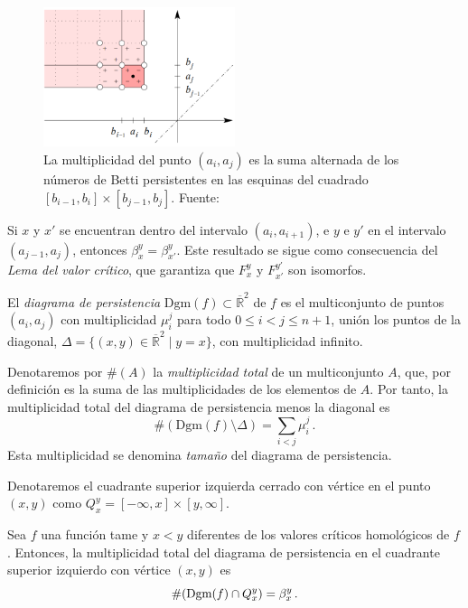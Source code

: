 \begin{figure}[!ht]
\centering
\includegraphics[width=0.5\textwidth]{include/figuras/multiplicidadEsquinas.png} 
\caption{La multiplicidad del punto $(a_i, a_j)$ es la suma alternada de los números de Betti persistentes en las esquinas del cuadrado $[b_{i-1}, b_i]\times[b_{j-1}, b_j]$. Fuente: \cite{Cohen-Steiner2007}}
\label{ref:multiplicidadDiagrama}
\end{figure}

\begin{remark}
Si $x$ y $x'$ se encuentran dentro del intervalo $(a_i, a_{i+1})$, e $y$ e $y'$ en el intervalo $(a_{j-1}, a_j)$, entonces $\beta_{x}^{y} = \beta_{x'}^{y}$. Este resultado se sigue como consecuencia del \emph{Lema del valor crítico}, que garantiza que $F_{x}^{y}$ y $F_{x'}^{y'}$ son isomorfos.
\end{remark}

\begin{definition}
El \emph{diagrama de persistencia} $\text{Dgm}(f) \subset \overline{\mathbb{R}}^2$ de $f$ es el multiconjunto de puntos $(a_i, a_j)$ con multiplicidad $\mu_{i}^{j}$ para todo $0 \leq i < j \leq n+1$, unión los puntos de la diagonal, $\Delta=\{(x, y) \in \overline{\mathbb{R}}^2 \mid y = x\}$, con multiplicidad infinito.
\end{definition}

Denotaremos por $\#(A)$ la \emph{multiplicidad total} de un multiconjunto $A$, que, por definición es la suma de las multiplicidades de los elementos de $A$. Por tanto, la multiplicidad total del diagrama de persistencia menos la diagonal es
\[
\#(\text{Dgm}(f) \setminus \Delta) = \sum_{i < j} \mu_{i}^{j}\,.
\]
Esta multiplicidad se denomina \emph{tamaño} del diagrama de persistencia.

Denotaremos el cuadrante superior izquierda cerrado con vértice en el punto $(x, y)$ como $Q_{x}^{y} = [-\infty, x] \times [y, \infty]$.

\begin{lemma}
Sea $f$ una función tame y $x < y$ diferentes de los valores críticos homológicos de $f$. Entonces, la multiplicidad total del diagrama de persistencia en el cuadrante superior izquierdo con vértice $(x, y)$ es
\[
\#(\text{\rm Dgm}(f) \cap Q_{x}^{y})= \beta_{x}^{y}\,.
\]
\end{lemma}

